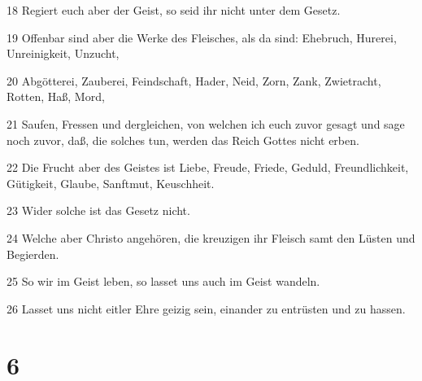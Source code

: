 \par 18 Regiert euch aber der Geist, so seid ihr nicht unter dem Gesetz.
\par 19 Offenbar sind aber die Werke des Fleisches, als da sind: Ehebruch, Hurerei, Unreinigkeit, Unzucht,
\par 20 Abgötterei, Zauberei, Feindschaft, Hader, Neid, Zorn, Zank, Zwietracht, Rotten, Haß, Mord,
\par 21 Saufen, Fressen und dergleichen, von welchen ich euch zuvor gesagt und sage noch zuvor, daß, die solches tun, werden das Reich Gottes nicht erben.
\par 22 Die Frucht aber des Geistes ist Liebe, Freude, Friede, Geduld, Freundlichkeit, Gütigkeit, Glaube, Sanftmut, Keuschheit.
\par 23 Wider solche ist das Gesetz nicht.
\par 24 Welche aber Christo angehören, die kreuzigen ihr Fleisch samt den Lüsten und Begierden.
\par 25 So wir im Geist leben, so lasset uns auch im Geist wandeln.
\par 26 Lasset uns nicht eitler Ehre geizig sein, einander zu entrüsten und zu hassen.

\chapter{6}

